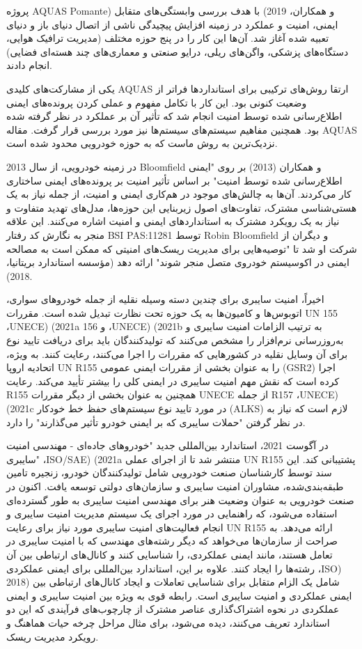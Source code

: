 \documentclass[a4paper,10pt]{article}
\begin{document}
        پروژه AQUAS Pomante) و همکاران، 2019) با هدف بررسی وابستگی‌های متقابل ایمنی، امنیت و عملکرد در زمینه افزایش پیچیدگی ناشی از اتصال دنیای باز و دنیای تعبیه شده آغاز شد. آن‌ها این کار را در پنج حوزه مختلف (مدیریت ترافیک هوایی، دستگاه‌های پزشکی، واگن‌های ریلی، درایو صنعتی و معماری‌های چند هسته‌ای فضایی) انجام دادند.

        یکی از مشارکت‌های کلیدی AQUAS ارتقا روش‌های ترکیبی برای استانداردها فراتر از وضعیت کنونی بود. این کار با تکامل مفهوم و عملی کردن پرونده‌های ایمنی اطلاع‌رسانی شده توسط امنیت انجام شد که تأثیر آن بر عملکرد در نظر گرفته شده بود. همچنین مفاهیم سیستم‌های سیستم‌ها نیز مورد بررسی قرار گرفت. مقاله AQUAS نزدیک‌ترین به روش ماست که به حوزه خودرویی محدود شده است.

        در زمینه خودرویی، از سال 2013 Bloomfield و همکاران (2013) بر روی "ایمنی اطلاع‌رسانی شده توسط امنیت" بر اساس تأثیر امنیت بر پرونده‌های ایمنی ساختاری کار می‌کردند. آن‌ها به چالش‌های موجود در هم‌کاری ایمنی و امنیت، از جمله نیاز به یک هستی‌شناسی مشترک، تفاوت‌های اصول زیربنایی این حوزه‌ها، مدل‌های تهدید متفاوت و نیاز به یک رویکرد مشترک به استانداردهای ایمنی و امنیت اشاره می‌کنند. این علاقه منجر به نگارش کد رفتار BSI PAS:11281 توسط Robin Bloomfield و دیگران از شرکت او شد تا "توصیه‌هایی برای مدیریت ریسک‌های امنیتی که ممکن است به مصالحه ایمنی در اکوسیستم خودروی متصل منجر شوند" ارائه دهد (مؤسسه استاندارد بریتانیا، 2018).

        اخیراً، امنیت سایبری برای چندین دسته وسیله نقلیه از جمله خودروهای سواری، اتوبوس‌ها و کامیون‌ها به یک حوزه تحت نظارت تبدیل شده است. مقررات UN 155 ،UNECE) (2021a 156 و ،UNECE) (2021b به ترتیب الزامات امنیت سایبری و به‌روزرسانی نرم‌افزار را مشخص می‌کنند که تولیدکنندگان باید برای دریافت تایید نوع برای آن وسایل نقلیه در کشورهایی که مقررات را اجرا می‌کنند، رعایت کنند. به ویژه، اتحادیه اروپا UN R155 را به عنوان بخشی از مقررات ایمنی عمومی (GSR2) اجرا کرده است که نقش مهم امنیت سایبری در ایمنی کلی را بیشتر تأیید می‌کند. رعایت R155 همچنین به عنوان بخشی از دیگر مقررات UNECE از جمله R157 ،UNECE) (2021c در مورد تایید نوع سیستم‌های حفظ خط خودکار (ALKS) لازم است که نیاز به در نظر گرفتن "حملات سایبری که بر ایمنی خودرو تأثیر می‌گذارند" را دارد.

        در آگوست 2021، استاندارد بین‌المللی جدید  "خودروهای جاده‌ای - مهندسی امنیت سایبری" ،ISO/SAE) (2021a منتشر شد تا از اجرای عملی UN R155 پشتیبانی کند. این سند توسط کارشناسان صنعت خودرویی شامل تولیدکنندگان خودرو، زنجیره تامین طبقه‌بندی‌شده، مشاوران امنیت سایبری و سازمان‌های دولتی توسعه یافت. اکنون در صنعت خودرویی به عنوان وضعیت هنر برای مهندسی امنیت سایبری به طور گسترده‌ای استفاده می‌شود، که راهنمایی در مورد اجرای یک سیستم مدیریت امنیت سایبری و انجام فعالیت‌های امنیت سایبری مورد نیاز برای رعایت UN R155 ارائه می‌دهد.  به صراحت از سازمان‌ها می‌خواهد که دیگر رشته‌های مهندسی که با امنیت سایبری در تعامل هستند، مانند ایمنی عملکردی، را شناسایی کنند و کانال‌های ارتباطی بین آن رشته‌ها را ایجاد کنند. علاوه بر این، استاندارد بین‌المللی  برای ایمنی عملکردی ،ISO) 2018) شامل یک الزام متقابل برای شناسایی تعاملات و ایجاد کانال‌های ارتباطی بین ایمنی عملکردی و امنیت سایبری است. رابطه قوی به ویژه بین امنیت سایبری و ایمنی عملکردی در نحوه اشتراک‌گذاری عناصر مشترک از چارچوب‌های فرآیندی که این دو استاندارد تعریف می‌کنند، دیده می‌شود، برای مثال مراحل چرخه حیات هماهنگ و رویکرد مدیریت ریسک.
\end{document}
